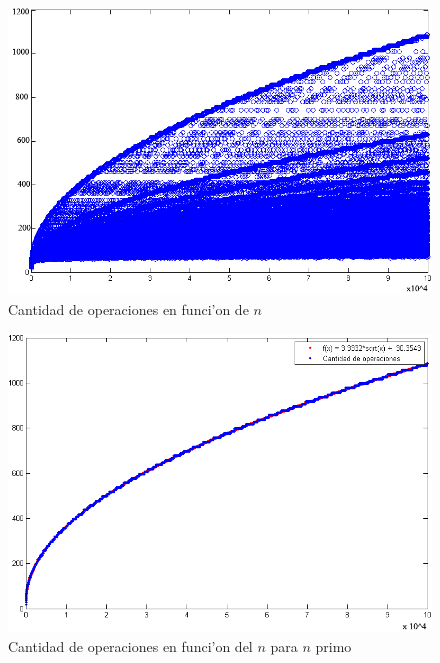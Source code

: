 \begin{figure}[H]
\centering
\includegraphics[scale=0.7]{../../codigo/ejercicio1/benchmark/graficos/todos_los_numeros/graficosTodos.png}
\caption{Cantidad de operaciones en funci'on de $n$}
\end{figure}

\begin{figure}[H]
\centering
\includegraphics[scale=0.8]{../../codigo/ejercicio1/benchmark/graficos/primos/graficoPrimos.png}
\caption{Cantidad de operaciones en funci'on del $n$ para $n$ primo}
\end{figure}

